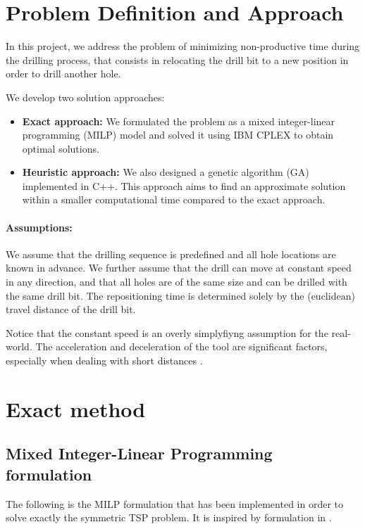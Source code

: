 \documentclass[../main.tex]{subfiles}
\begin{document}
\section{Problem Definition and Approach}

In this project, we address the problem of minimizing non-productive time during the drilling process, that consists in relocating the drill bit to a new position in
order to drill another hole.

We develop two solution approaches:
\begin{itemize}
    \item \textbf{Exact approach:} We formulated the problem as a mixed integer-linear programming (MILP) model and solved it using IBM CPLEX to obtain optimal solutions.
    \item \textbf{Heuristic approach:} We also designed a genetic algorithm (GA) implemented in C++. This approach aims to find an approximate solution within a smaller computational time compared to the exact approach.
\end{itemize}

\paragraph{Assumptions:}  
We assume that the drilling sequence is predefined and all hole locations are known in advance. 
We further assume that the drill can move at constant speed in any direction, and that all holes are of the same size and can be drilled with the same drill bit.
The repositioning time is determined solely by the (euclidean) travel distance of the drill bit.

Notice that the constant speed is an overly simplyfiyng assumption for the real-world. The acceleration and deceleration of the 
tool are significant factors, especially when dealing with short distances 
\cite{KHODABAKHSHI2021426}.

\section{Exact method}
\subsection{Mixed Integer-Linear Programming formulation}\label{subsec:milp-form}
The following is the MILP formulation that has been implemented in order to solve exactly the symmetric TSP problem. It is inspired by formulation in \cite{Gavish1978TheTS}.
\end{document}
